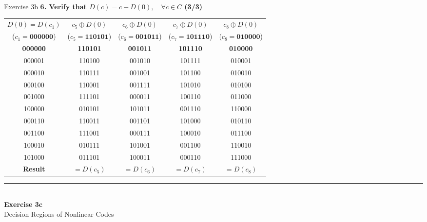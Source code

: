 \documentclass[10pt, aspectratio=169]{beamer}
\newcommand{\question}[1]{{\color{QuestionRed}\textbf{#1}}}
\begin{document}
\begin{frame}{Exercise 3b}
	\question{6. Verify that $D(c) = c + D(0), \quad \forall c \in C$ (3/3)}
	
	\vspace{0.15cm}
	\begin{table}
		\centering
		\scriptsize
		\renewcommand{\arraystretch}{1.15}
		\begin{tabular}{c | c c c c}
			\toprule
			\textbf{$D(0) = D(c_1)$} & \textbf{$c_5 \oplus D(0)$} & \textbf{$c_6 \oplus D(0)$} & \textbf{$c_7 \oplus D(0)$} & \textbf{$c_8 \oplus D(0)$} \\
			($c_1 = \mathbf{000000}$) & ($c_5 = \mathbf{110101}$) & ($c_6 = \mathbf{001011}$) & ($c_7 = \mathbf{101110}$) & ($c_8 = \mathbf{010000}$) \\
			\midrule
			\textbf{000000} & \textbf{110101} & \textbf{001011} & \textbf{101110} & \textbf{010000} \\
			000001 & 110100 & 001010 & 101111 & 010001 \\
			000010 & 110111 & 001001 & 101100 & 010010 \\
			000100 & 110001 & 001111 & 101010 & 010100 \\
			001000 & 111101 & 000011 & 100110 & 011000 \\
			100000 & 010101 & 101011 & 001110 & 110000 \\
			000110 & 110011 & 001101 & 101000 & 010110 \\
			001100 & 111001 & 000111 & 100010 & 011100 \\
			100010 & 010111 & 101001 & 001100 & 110010 \\
			101000 & 011101 & 100011 & 000110 & 111000 \\
			\midrule
			\textbf{Result} & $= D(c_5)$ \checkmark & $= D(c_6)$ \checkmark & $= D(c_7)$ \checkmark & $= D(c_8)$ \checkmark \\
			\bottomrule
		\end{tabular}
	\end{table}
\end{frame}

\begin{frame}[plain]
  \vfill
  \centering
  {\color{TealAccent}\rule{2cm}{2pt}}\\[0.4cm]
  {\LARGE\bfseries\color{NavyPrimary} Exercise 3c}\\[0.2cm]
  {\large\color{SlateNeutral} Decision Regions of Nonlinear Codes}
  \vfill
\end{frame}
\end{document}
